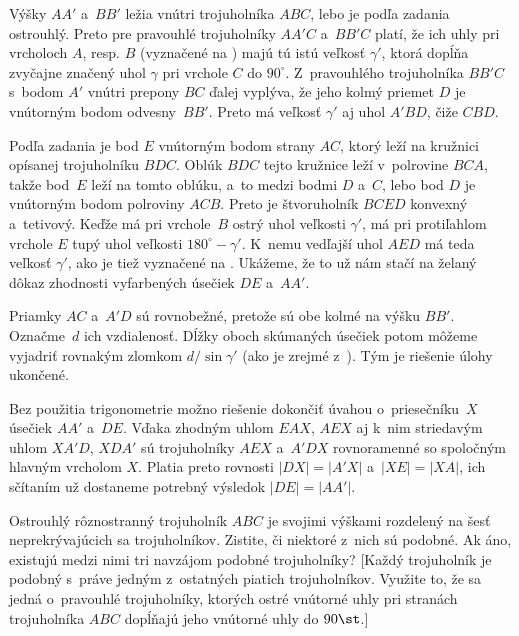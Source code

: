 {%
Výšky $AA'$ a~$BB'$ ležia vnútri trojuholníka $ABC$, lebo
je podľa zadania ostrouhlý. Preto pre pravouhlé
trojuholníky $AA'C$ a~$BB'C$ platí, že ich uhly pri vrcholoch $A$, resp. $B$
(vyznačené na \obr) majú tú istú veľkosť $\gamma'$, ktorá
dopĺňa zvyčajne značený uhol $\gamma$ pri vrchole $C$ do
$90^\circ$. Z~pravouhlého trojuholníka $BB'C$ s~bodom $A'$ vnútri
prepony $BC$ ďalej vyplýva, že jeho kolmý priemet $D$ je vnútorným
bodom odvesny~$BB'$. Preto má veľkosť $\gamma'$
aj uhol $A'BD$, čiže $CBD$.
%

Podľa zadania je bod $E$ vnútorným bodom strany $AC$, ktorý leží
na kružnici opísanej trojuholníku $BDC$. Oblúk $BDC$ tejto kružnice
leží v~polrovine $BCA$, takže bod~$E$ leží na tomto oblúku,
a~to medzi bodmi $D$ a~$C$, lebo bod $D$ je vnútorným bodom
polroviny $ACB$. Preto je štvoruholník $BCED$
konvexný a~tetivový. Keďže má pri vrchole~$B$ ostrý uhol
veľkosti $\gamma'$,
má pri protiľahlom vrchole $E$ tupý uhol veľkosti
$180^{\circ}-\gamma'$. K~nemu vedľajší uhol $AED$ má teda
veľkosť $\gamma'$, ako je tiež vyznačené na .
Ukážeme, že to už nám stačí na želaný dôkaz
zhodnosti vyfarbených úsečiek $DE$ a~$AA'$.

Priamky $AC$ a~$A'D$ sú rovnobežné, pretože sú obe kolmé
na výšku $BB'$. Označme~$d$ ich vzdialenosť. Dĺžky
oboch skúmaných úsečiek potom môžeme vyjadriť rovnakým zlomkom
$d/\sin\gamma'$ (ako je zrejmé z~\obr). Tým je riešenie úlohy
ukončené.
%

\Pozn
Bez použitia trigonometrie možno riešenie dokončiť
úvahou o~priesečníku~$X$ úsečiek $AA'$ a~$DE$. Vďaka zhodným uhlom
$EAX$, $AEX$ aj k~nim striedavým uhlom $XA'D$, $XDA'$ sú trojuholníky
$AEX$ a~$A'DX$ rovnoramenné so spoločným hlavným vrcholom $X$.
Platia preto rovnosti $|DX|=|A'X|$ a~$|XE|=|XA|$, ich sčítaním
už dostaneme potrebný výsledok $|DE|=|AA'|$.


Ostrouhlý rôznostranný trojuholník $ABC$ je svojimi výškami
rozdelený na šesť neprekrývajúcich sa trojuholníkov.
Zistite, či niektoré z~nich sú podobné. Ak áno, existujú
medzi nimi tri navzájom podobné trojuholníky?
[Každý trojuholník je podobný s~práve jedným z~ostatných piatich trojuholníkov.
Využite to, že sa jedná o~pravouhlé trojuholníky, ktorých ostré vnútorné uhly
pri stranách trojuholníka $ABC$ dopĺňajú jeho vnútorné uhly do
$90\st$.]

}
